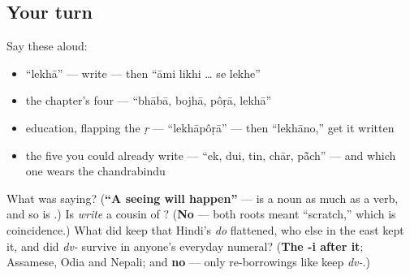 \subsection*{Your turn}
Say these aloud:

\begin{itemize}
\raggedright
  \item \textquotedblleft{}lekhā\textquotedblright{} — write — then \textquotedblleft{}āmi likhi … se lekhe\textquotedblright{}
  \item the chapter's four — \textquotedblleft{}bhābā, bojhā, pôṛā, lekhā\textquotedblright{}
  \item education, flapping the \emph{ṛ} — \textquotedblleft{}lekhāpôṛā\textquotedblright{} — then \textquotedblleft{}lekhāno,\textquotedblright{} get it written
  \item the five you could already write — \textquotedblleft{}ek, dui, tin, chār, pā̃ch\textquotedblright{} — and which one wears the chandrabindu
\end{itemize}

\begin{tcolorbox}[breakable,colback=teal!4,colframe=teal!35!black,title={Before you move on}]
What was \textbf{ } saying? (\textbf{\textquotedblleft{}A seeing will happen\textquotedblright{}} —  is a noun as much as a verb, and so is .) Is \emph{write} a cousin of ? (\textbf{No} — both roots meant \textquotedblleft{}scratch,\textquotedblright{} which is coincidence.) What did \textbf{} keep that Hindi's \emph{do} flattened, who else in the east kept it, and did \emph{dv-} survive in anyone's everyday numeral? (\textbf{The -i after it}; Assamese, Odia and Nepali; and \textbf{no} — only re-borrowings like \textbf{} keep \emph{dv-}.)
\end{tcolorbox}
